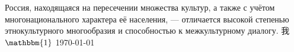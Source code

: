 \documentclass{article}
\begin{document}
Россия, находящаяся на пересечении множества культур, а также
с учётом многонационального характера её населения, — отличается
высокой степенью этнокультурного многообразия и способностью к
межкультурному диалогу.
我
\(\mathbbm{1}\)
\today
\end{document}
